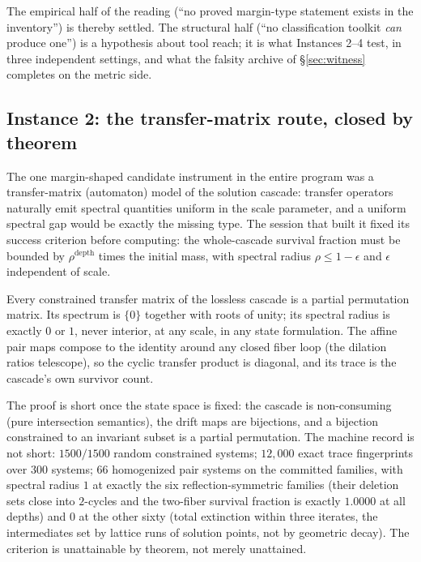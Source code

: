 The empirical half of the reading (``no proved margin-type statement
exists in the inventory'') is thereby settled. The structural half (``no
classification toolkit \emph{can} produce one'') is a hypothesis about
tool reach; it is what Instances 2--4 test, in three independent
settings, and what the falsity archive of \S\ref{sec:witness} completes
on the metric side.

\subsection{Instance 2: the transfer-matrix route, closed by theorem}
\label{sec:tm-transfer}

The one margin-shaped candidate instrument in the entire program was a
transfer-matrix (automaton) model of the solution cascade: transfer
operators naturally emit spectral quantities uniform in the scale
parameter, and a uniform spectral gap would be exactly the missing type.
The session that built it fixed its success criterion before computing:
the whole-cascade survival fraction must be bounded by
$\rho^{\mathrm{depth}}$ times the initial mass, with spectral radius
$\rho\le 1-\epsilon$ and $\epsilon$ independent of scale.

\begin{lemma}
\label{lem:monomial}
Every constrained transfer matrix of the lossless cascade is a partial
permutation matrix. Its spectrum is $\{0\}$ together with roots of unity;
its spectral radius is exactly $0$ or $1$, never interior, at any scale,
in any state formulation. The affine pair maps compose to the identity
around any closed fiber loop (the dilation ratios telescope), so the
cyclic transfer product is diagonal, and its trace is the cascade's own
survivor count.
\end{lemma}

The proof is short once the state space is fixed: the cascade is
non-consuming (pure intersection semantics), the drift maps are
bijections, and a bijection constrained to an invariant subset is a
partial permutation. The machine record is not short: $1500/1500$ random
constrained systems; $12{,}000$ exact trace fingerprints over $300$
systems; $66$ homogenized pair systems on the committed families, with
spectral radius $1$ at exactly the six reflection-symmetric families
(their deletion sets close into $2$-cycles and the two-fiber survival
fraction is exactly $1.0000$ at all depths) and $0$ at the other sixty
(total extinction within three iterates, the intermediates set by lattice
runs of solution points, not by geometric decay). The criterion is
unattainable by theorem, not merely unattained.

